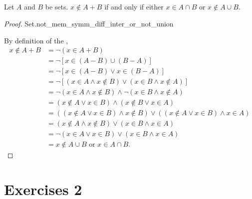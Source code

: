 \documentclass{report}
\begin{document}
\subsection{}
\label{sub:nonmembership-symmetric-difference}

Let $A$ and $B$ be sets. $x \not\in A + B$ if and only if either
  $x \in A \cap B$ or $x \not\in A \cup B$.

\begin{proof}

    {Set.not\_mem\_symm\_diff\_inter\_or\_not\_union}

  By definition of the ,
    \begin{align*}
      x \not\in A + B
        & = \neg(x \in A + B) \\
        & = \neg[x \in (A - B) \cup (B - A)] \\
        & = \neg[x \in (A - B) \lor x \in (B - A)] \\
        & = \neg[(x \in A \land x \not\in B) \lor
          (x \in B \land x \not\in A)] \\
        & = \neg(x \in A \land x \not\in B) \land
          \neg(x \in B \land x \not\in A) \\
        & = (x \not\in A \lor x \in B) \land (x \not\in B \lor x \in A) \\
        & = ((x \not\in A \lor x \in B) \land x \not\in B) \lor
          ((x \not\in A \lor x \in B) \land x \in A) \\
        & = (x \not\in A \land x \not\in B) \lor (x \in B \land x \in A) \\
        & = \neg(x \in A \lor x \in B) \lor (x \in B \land x \in A) \\
        & = x \not\in A \cup B \text{ or } x \in A \cap B.
    \end{align*}

\end{proof}

\section{Exercises 2}%
\label{sec:exercises-2}

\subsection{}%
\label{sub:exercise-2.1}
\end{document}
